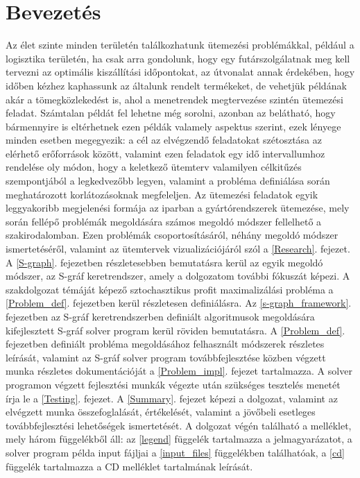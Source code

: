 \chapter{Bevezetés}
\setcounter{page}{1}
Az élet szinte minden területén találkozhatunk ütemezési problémákkal, például a logisztika területén, ha csak arra gondolunk, hogy egy futárszolgálatnak meg kell tervezni az optimális kiszállítási időpontokat, az útvonalat annak érdekében, hogy időben kézhez kaphassunk az általunk rendelt termékeket, de vehetjük példának akár a tömegközlekedést is, ahol a menetrendek megtervezése szintén ütemezési feladat.
Számtalan példát fel lehetne még sorolni, azonban az belátható, hogy bármennyire is eltérhetnek ezen példák valamely aspektus szerint, ezek lényege minden esetben megegyezik: a cél az elvégzendő feladatokat szétosztása az elérhető erőforrások között, valamint ezen feladatok egy idő intervallumhoz rendelése oly módon, hogy a keletkező ütemterv valamilyen célkitűzés szempontjából a legkedvezőbb legyen, valamint a probléma definiálása során meghatározott korlátozásoknak megfeleljen.
Az ütemezési feladatok egyik leggyakoribb megjelenési formája az iparban a gyártórendszerek ütemezése, mely során fellépő problémák megoldására számos megoldó módszer fellelhető a szakirodalomban.
Ezen problémák csoportosításáról, néhány megoldó módszer ismertetéséről, valamint az ütemtervek vizualizációjáról szól a \ref{Research}. fejezet.
A \ref{S-graph}. fejezetben részletesebben bemutatásra kerül az egyik megoldó módszer, az S-gráf keretrendszer, amely a dolgozatom további fókuszát képezi.
A szakdolgozat témáját képező sztochasztikus profit maximalizálási probléma a \ref {Problem_def}. fejezetben kerül részletesen definiálásra.
Az \ref{s-graph_framework}. fejezetben az S-gráf keretrendszerben definiált algoritmusok megoldására kifejlesztett S-gráf solver program kerül röviden bemutatásra.
A \ref{Problem_def}. fejezetben definiált probléma megoldásához felhasznált módszerek részletes leírását, valamint az S-gráf solver program továbbfejlesztése közben végzett munka részletes dokumentációját a \ref{Problem_impl}. fejezet tartalmazza.
A solver programon végzett fejlesztési munkák végezte után szükséges tesztelés menetét írja le a \ref{Testing}. fejezet.
A \ref{Summary}. fejezet képezi a dolgozat, valamint az elvégzett munka összefoglalását, értékelését, valamint a jövőbeli esetleges továbbfejlesztési lehetőségek ismertetését.
A dolgozat végén található a melléklet, mely három függelékből áll: az \ref{legend} függelék tartalmazza a jelmagyarázatot, a solver program példa input fájljai a \ref{input_files} függelékben találhatóak, a \ref{cd} függelék tartalmazza a CD melléklet tartalmának leírását.   